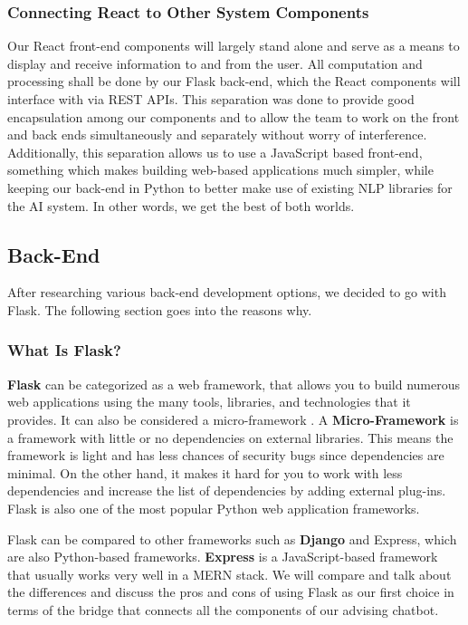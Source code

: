 \documentclass[titlepage, 12pt]{article}
\begin{document}
\subsubsection{Connecting React to Other System Components}

Our React front-end components will largely stand alone and serve as a means to display and receive information to and from the user. All computation and processing shall be done by our Flask back-end, which the React components will interface with via REST APIs. This separation was done to provide good encapsulation among our components and to allow the team to work on the front and back ends simultaneously and separately without worry of interference. Additionally, this separation allows us to use a JavaScript based front-end, something which makes building web-based applications much simpler, while keeping our back-end in Python to better make use of existing NLP libraries for the AI system. In other words, we get the best of both worlds.


\subsection{Back-End}

After researching various back-end development options, we decided to go with Flask. The following section goes into the reasons why.

\subsubsection{What Is Flask?}

\textbf{Flask} can be categorized as a web framework, that allows you to build numerous web applications using the many tools, libraries, and technologies that it provides. It can also be considered a micro-framework \cite{bib-1-20}. A \textbf{Micro-Framework} is a framework with little or no dependencies on external libraries. This means the framework is light and has less chances of security bugs since dependencies are minimal. On the other hand, it makes it hard for you to work with less dependencies and increase the list of dependencies by adding external plug-ins. Flask is also one of the most popular Python web application frameworks.

Flask can be compared to other frameworks such as \textbf{Django} and Express, which are also Python-based frameworks. \textbf{Express} is a JavaScript-based framework that usually works very well in a MERN stack. We will compare and talk about the differences and discuss the pros and cons of using Flask as our first choice in terms of the bridge that connects all the components of our advising chatbot.
\end{document}

